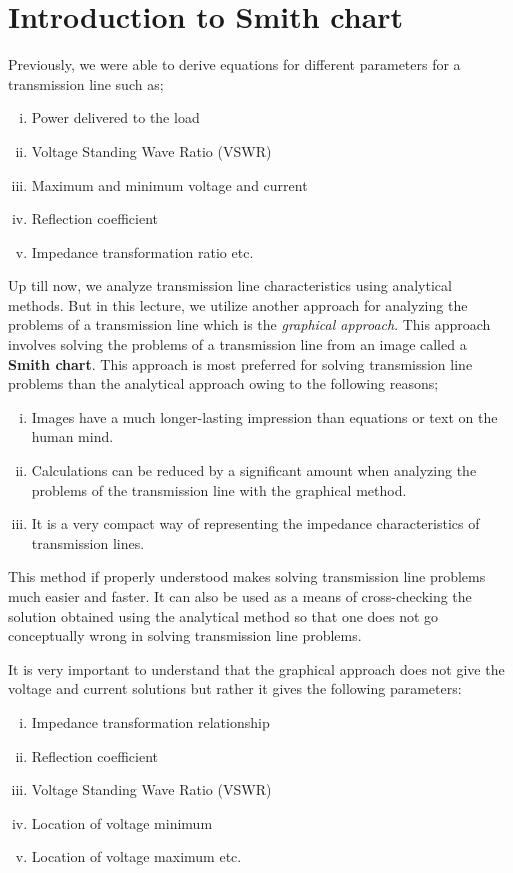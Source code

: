 \section{Introduction to Smith chart}\label{lec:lec7}
Previously, we were able to derive equations for different parameters for a transmission line such as;
\begin{enumerate}[(i)]
\item Power delivered to the load
\item Voltage Standing Wave Ratio (VSWR)
\item Maximum and minimum voltage and current
\item Reflection coefficient
\item Impedance transformation ratio etc.
\end{enumerate}

Up till now, we analyze transmission line characteristics using analytical methods. But in this lecture, we utilize another approach for analyzing the problems of a transmission line which is the \emph{graphical approach}. This approach involves solving the problems of a transmission line from an image called a \textbf{Smith chart}. This approach is most preferred for solving transmission line problems than the analytical approach owing to the following reasons;
\begin{enumerate}[(i)]
\item Images have a much longer-lasting impression than equations or text on the human mind.
\item Calculations can be reduced by a significant amount when analyzing the problems of the transmission line with the graphical method.
\item It is a very compact way of representing the impedance characteristics of transmission lines.
\end{enumerate}

This method if properly understood makes solving transmission line problems much easier and faster. It can also be used as a means of cross-checking the solution obtained using the analytical method so that one does not go conceptually wrong in solving transmission line problems.

It is very important to understand that the graphical approach does not give the voltage and current solutions but rather it gives the following parameters:
\begin{enumerate}[(i)]
\item Impedance transformation relationship 
\item Reflection coefficient
\item Voltage Standing Wave Ratio (VSWR)
\item Location of voltage minimum
\item Location of voltage maximum etc.
\end{enumerate}

